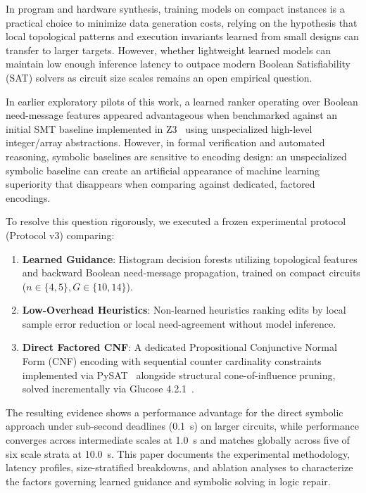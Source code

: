 \documentclass[11pt]{article}
\begin{document}
In program and hardware synthesis, training models on compact instances is a practical choice to minimize data generation costs, relying on the hypothesis that local topological patterns and execution invariants learned from small designs can transfer to larger targets. However, whether lightweight learned models can maintain low enough inference latency to outpace modern Boolean Satisfiability (SAT) solvers as circuit size scales remains an open empirical question.

In earlier exploratory pilots of this work, a learned ranker operating over Boolean need-message features appeared advantageous when benchmarked against an initial SMT baseline implemented in Z3~\citep{demoura2008z3} using unspecialized high-level integer/array abstractions. However, in formal verification and automated reasoning, symbolic baselines are sensitive to encoding design: an unspecialized symbolic baseline can create an artificial appearance of machine learning superiority that disappears when comparing against dedicated, factored encodings.

To resolve this question rigorously, we executed a frozen experimental protocol (Protocol v3) comparing:
\begin{enumerate}
    \item \textbf{Learned Guidance}: Histogram decision forests utilizing topological features and backward Boolean need-message propagation, trained on compact circuits ($n \in \{4, 5\}, G \in \{10, 14\}$).
    \item \textbf{Low-Overhead Heuristics}: Non-learned heuristics ranking edits by local sample error reduction or local need-agreement without model inference.
    \item \textbf{Direct Factored CNF}: A dedicated Propositional Conjunctive Normal Form (CNF) encoding with sequential counter cardinality constraints implemented via PySAT~\citep{ignatiev2018pysat} alongside structural cone-of-influence pruning, solved incrementally via Glucose 4.2.1~\citep{audemard2018glucose}.
\end{enumerate}

The resulting evidence shows a performance advantage for the direct symbolic approach under sub-second deadlines (0.1~s) on larger circuits, while performance converges across intermediate scales at 1.0~s and matches globally across five of six scale strata at 10.0~s. This paper documents the experimental methodology, latency profiles, size-stratified breakdowns, and ablation analyses to characterize the factors governing learned guidance and symbolic solving in logic repair.
\end{document}
